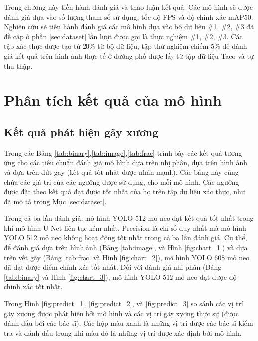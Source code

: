 \documentclass[../the.tex]{subfiles}
\begin{document}
{\fontsize{13}{12} \selectfont
Trong chương này tiền hành đánh giá và thảo luận kết quả. Các mô hình sẽ được đánh giá dựa vào số lượng tham số sử dụng, tốc độ FPS và độ chính xác mAP50.
Nghiên cứu sẽ tiến hành đánh giá các mô hình dựa vào bộ dữ liệu \#1, \#2, \#3 đã đề cập ở phần \ref{sec:dataset} lần lượt được gọi là thực nghiệm \#1, \#2, \#3.
Các tập xác thực được tạo từ $20\%$ từ bộ dữ liệu, tập thử nghiệm chiếm $5\%$ để đánh giá kết quả trên hình ảnh thực tế ở đường phố được lấy từ tập dữ liệu Taco và tự thu thập.
}

\section{Phân tích kết quả của mô hình}
\label{sec:result}

\subsection{Kết quả phát hiện gãy xương}

{\fontsize{13}{12} \selectfont
Trong các Bảng \ref{tab:binary},\ref{tab:image},\ref{tab:frac} trình bày các kết quả tương ứng cho các tiêu chuẩn đánh giá mô hình dựa trên nhị phân, dựa trên hình ảnh và dựa trên đứt gãy (kết quả tốt nhất được nhấn mạnh). Các bảng này cũng chứa các giá trị của các ngưỡng được sử dụng, cho mỗi mô hình. Các ngưỡng được đặt theo kết quả đạt được tốt nhất của họ trên tập dữ liệu xác thực, như đã mô tả trong Mục \ref{sec:dataset}.

Trong cả ba lần đánh giá, mô hình YOLO 512 mỏ neo đạt kết quả tốt nhất trong khi mô hình U-Net liên tục kém nhất. Precision là chỉ số duy nhất mà mô hình YOLO 512 mỏ neo không hoạt động tốt nhất trong cả ba lần đánh giá. Cụ thể, để đánh giá dựa trên hình ảnh (Bảng \ref{tab:image}, và Hình \ref{fig:chart_1}) và dựa trên vết gãy (Bảng \ref{tab:frac} và Hình \ref{fig:chart_2}), mô hình YOLO 608 mỏ neo đã đạt được điểm chính xác tốt nhất. Đối với đánh giá nhị phân (Bảng \ref{tab:binary} và Hình \ref{fig:chart_3}), mô hình YOLO 512 mỏ neo đạt được độ chính xác tốt nhất.


Trong Hình \ref{fig:predict_1}, \ref{fig:predict_2}, và \ref{fig:predict_3} so sánh các vị trí gãy xương được phát hiện bởi mô hình và các vị trí gãy xyơng thực sự (được đánh dấu bởi các bác sĩ). Các hộp màu xanh là những vị trí được các bác sĩ kiểm tra và đánh dấu trong khi màu đỏ là những vị trí được xác định bởi mô hình.
}
\end{document}
